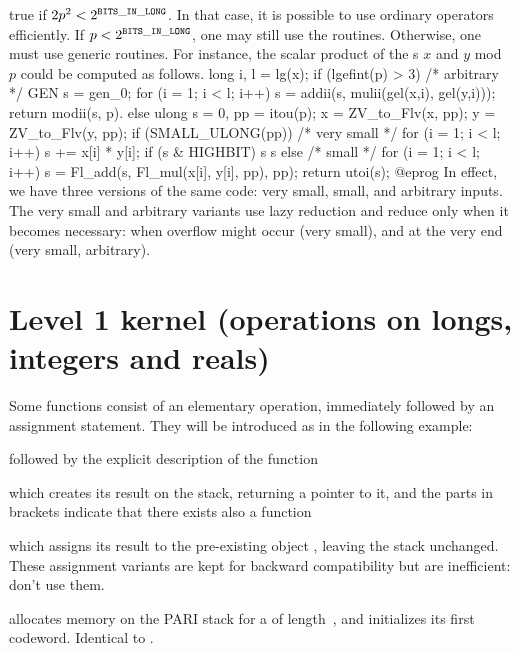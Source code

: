  true if $2p^2 <2^{\tt BITS\_IN\_LONG}$. In that case, it is
possible to use ordinary operators efficiently. If $p < 2^{\tt BITS\_IN\_LONG}$, one
may still use the  routines. Otherwise, one must use generic
routines. For instance, the scalar product of the s $x$ and $y$ mod
$p$ could be computed as follows.
\bprog
    long i, l = lg(x);
    if (lgefint(p) > 3)
    { /* arbitrary */
      GEN s = gen_0;
      for (i = 1; i < l; i++) s = addii(s, mulii(gel(x,i), gel(y,i)));
      return modii(s, p).
    }
    else
    {
      ulong s = 0, pp = itou(p);
      x = ZV_to_Flv(x, pp);
      y = ZV_to_Flv(y, pp);
      if (SMALL_ULONG(pp))
      { /* very small */
        for (i = 1; i < l; i++)
        {
          s += x[i] * y[i];
          if (s & HIGHBIT) s %
        }
        s %
      }
      else
      { /* small */
        for (i = 1; i < l; i++)
          s = Fl_add(s, Fl_mul(x[i], y[i], pp), pp);
      }
      return utoi(s);
    }
@eprog\noindent
In effect, we have three versions of the same code: very small, small, and
arbitrary inputs. The very small and arbitrary variants use lazy reduction
and reduce only when it becomes necessary: when overflow might occur (very
small), and at the very end (very small, arbitrary).

\section{Level 1 kernel (operations on longs, integers and reals)}

 Some functions consist of an elementary operation,
immediately followed by an assignment statement. They will be introduced as
in the following example:

 followed by the explicit
description of the function


\noindent which creates its result on the stack, returning a  pointer
to it, and the parts in brackets indicate that there exists also a function


\noindent which assigns its result to the pre-existing object
, leaving the stack unchanged. These assignment variants are kept for
backward compatibility but are inefficient: don't use them.


 allocates memory on the PARI stack for a 
of length~, and initializes its first codeword. Identical to
.

